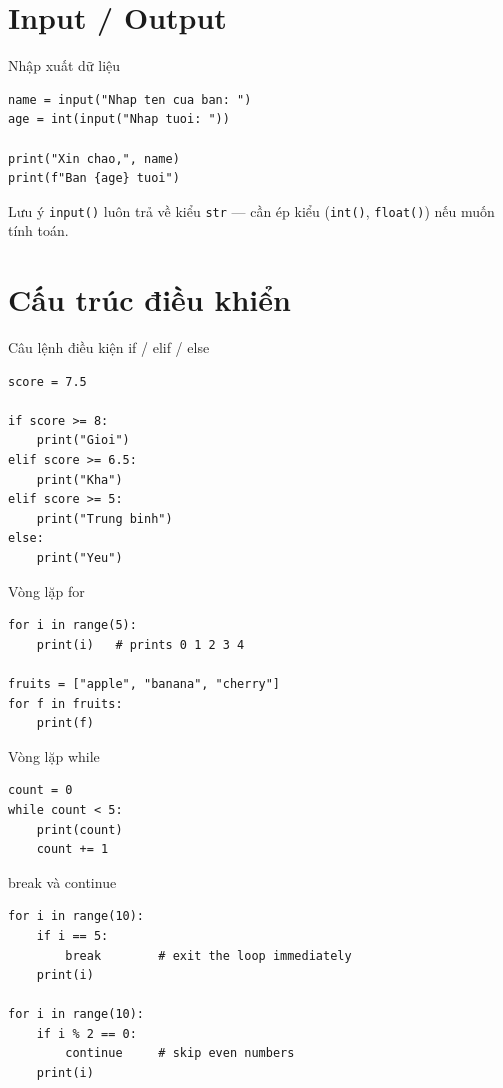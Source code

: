 \documentclass[11pt]{beamer}
\begin{document}
\section{Input / Output}

\begin{frame}[fragile]{Nhập xuất dữ liệu}
\begin{lstlisting}
name = input("Nhap ten cua ban: ")
age = int(input("Nhap tuoi: "))

print("Xin chao,", name)
print(f"Ban {age} tuoi")
\end{lstlisting}
\begin{alertblock}{Lưu ý}
\texttt{input()} luôn trả về kiểu \texttt{str} — cần ép kiểu (\texttt{int()}, \texttt{float()}) nếu muốn tính toán.
\end{alertblock}
\end{frame}

\section{Cấu trúc điều khiển}

\begin{frame}[fragile]{Câu lệnh điều kiện if / elif / else}
\begin{lstlisting}
score = 7.5

if score >= 8:
    print("Gioi")
elif score >= 6.5:
    print("Kha")
elif score >= 5:
    print("Trung binh")
else:
    print("Yeu")
\end{lstlisting}
\end{frame}

\begin{frame}[fragile]{Vòng lặp for}
\begin{lstlisting}
for i in range(5):
    print(i)   # prints 0 1 2 3 4

fruits = ["apple", "banana", "cherry"]
for f in fruits:
    print(f)
\end{lstlisting}
\end{frame}

\begin{frame}[fragile]{Vòng lặp while}
\begin{lstlisting}
count = 0
while count < 5:
    print(count)
    count += 1
\end{lstlisting}
\end{frame}

\begin{frame}[fragile]{break và continue}
\begin{lstlisting}
for i in range(10):
    if i == 5:
        break        # exit the loop immediately
    print(i)

for i in range(10):
    if i % 2 == 0:
        continue     # skip even numbers
    print(i)
\end{lstlisting}
\end{frame}
\end{document}
